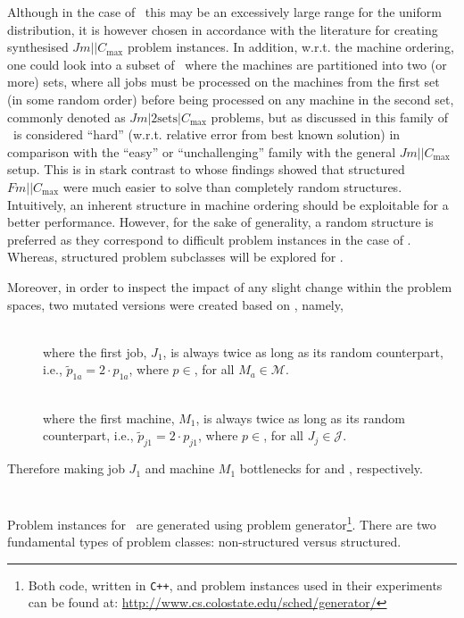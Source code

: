 Although in the case of \ this may be an excessively large range for the uniform distribution, it is however chosen in accordance with the literature \citep{Demirkol98} for creating synthesised $Jm||C_{\max}$ problem instances. In addition, w.r.t. the machine ordering, one could look into a subset of \JSP\ where the machines are partitioned into two (or more) sets, where all jobs must be processed on the machines from the first set (in some random order) before being processed on any machine in the second set, commonly denoted as $Jm|2\textrm{sets}|C_{\max}$ problems, but as discussed in \cite{orlib_swv} this family of \JSP\ is considered ``hard'' (w.r.t. relative error from best known solution) in comparison with the ``easy'' or ``unchallenging'' family with the general $Jm||C_{\max}$ setup. %
This is in stark contrast to \citet{Whitley} whose findings showed that structured $Fm||C_{\max}$ were much easier to solve than completely random structures. 
Intuitively, an inherent structure in machine ordering should be exploitable for a better performance.  However, for the sake of generality, a random structure is preferred as they correspond to difficult problem instances in the case of \JSP. Whereas, structured problem subclasses will be explored for \FSP.  

Moreover, in order to inspect the impact of any slight change within the problem spaces, two mutated versions were created based on , namely, 
\begin{description}
	\item[\JrndJ]  \hfill \\ where the first job, $J_1$, is always twice as long as its random counterpart, i.e.,\linebreak
	$\tilde{p}_{1a}=2\cdot p_{1a}$, where $p\in$, for all $M_a\in\mathcal{M}$. 
	\item[\JrndM]  \hfill \\ where the first machine, $M_1$, is always twice as long as its random counterpart, i.e.,\linebreak
	$\tilde{p}_{j1}=2\cdot p_{j1}$, where $p\in$, for all $J_j\in\mathcal{J}$. 
\end{description}
Therefore making job $J_1$ and machine $M_1$ bottlenecks for  and , respectively.

\section{\Fsp}\label{sec:data:FSP}
Problem instances for \FSP\  are generated using \citet{Whitley} problem generator\footnote{Both code, written in \texttt{C++}, and problem instances used in their experiments can be found at: \url{http://www.cs.colostate.edu/sched/generator/}}. There are two fundamental types of problem classes: non-structured versus structured.

